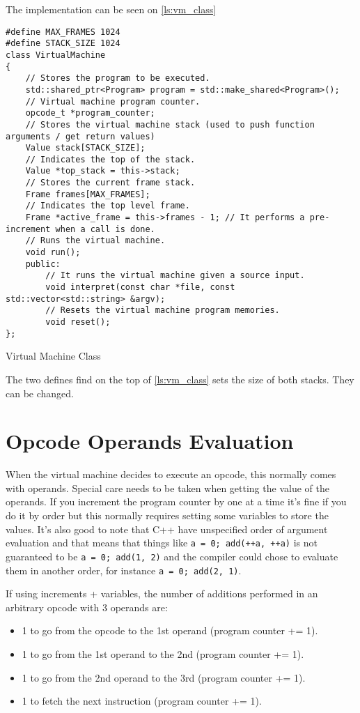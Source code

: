 The implementation can be seen on \autoref{ls:vm_class}

\begin{listing}[H]
\begin{verbatim}
#define MAX_FRAMES 1024
#define STACK_SIZE 1024
class VirtualMachine
{
    // Stores the program to be executed.
    std::shared_ptr<Program> program = std::make_shared<Program>();
    // Virtual machine program counter.
    opcode_t *program_counter;
    // Stores the virtual machine stack (used to push function arguments / get return values)
    Value stack[STACK_SIZE];
    // Indicates the top of the stack.
    Value *top_stack = this->stack;
    // Stores the current frame stack.
    Frame frames[MAX_FRAMES];
    // Indicates the top level frame.
    Frame *active_frame = this->frames - 1; // It performs a pre-increment when a call is done.
    // Runs the virtual machine.
    void run();
    public:
        // It runs the virtual machine given a source input.
        void interpret(const char *file, const std::vector<std::string> &argv);
        // Resets the virtual machine program memories.
        void reset();
};
\end{verbatim}
\caption{Virtual Machine Class}
\label{ls:vm_class}
\end{listing}

The two defines find on the top of \autoref{ls:vm_class} sets the size of both stacks. They can be changed.

\section{Opcode Operands Evaluation}

When the virtual machine decides to execute an opcode, this normally comes with operands. Special care needs to be taken when getting the value of the
operands. If you increment the program counter by one at a time it's fine if you do it by order but this normally requires setting some variables
to store the values. It's also good to note that C++ have unspecified order of argument evaluation and that means that things like
\texttt{a = 0; add(++a, ++a)} is not guaranteed to be \texttt{a = 0; add(1, 2)} and the compiler could chose to evaluate them in another order, for instance
\texttt{a = 0; add(2, 1)}.

If using increments + variables, the number of additions performed in an arbitrary opcode with 3 operands are:

\begin{itemize}
    \item 1 to go from the opcode to the 1st operand (program counter += 1).
    \item 1 to go from the 1st operand to the 2nd (program counter += 1).
    \item 1 to go from the 2nd operand to the 3rd (program counter += 1).
    \item 1 to fetch the next instruction (program counter += 1).
\end{itemize}


